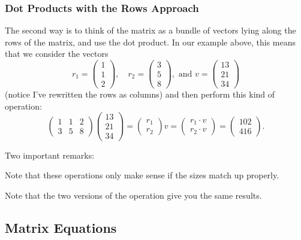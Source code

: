 \documentclass[11pt]{amsart}
\theoremstyle{definition}
\begin{document}
\subsubsection{Dot Products with the Rows Approach} The second way is to think of the matrix as a bundle of vectors lying along the rows of the matrix, and use the dot product. In our example above, this means that we consider the vectors
\[
r_1 = \begin{pmatrix} 1 \\ 1 \\ 2 \end{pmatrix}, \quad
r_2 = \begin{pmatrix} 3 \\ 5 \\ 8 \end{pmatrix}, \text{ and }
v = \begin{pmatrix} 13 \\ 21 \\ 34 \end{pmatrix}
\]
(notice I've rewritten the rows as columns) and then perform this kind of operation:
\[
\begin{pmatrix} 1 & 1 & 2 \\ 3 & 5 & 8 \end{pmatrix} \begin{pmatrix} 13 \\ 21 \\ 34 \end{pmatrix} =
\begin{pmatrix} r_1 \\ r_2 \end{pmatrix} v =
\begin{pmatrix} r_1 \cdot v \\ r_2 \cdot v \end{pmatrix} =
\begin{pmatrix} 102 \\ 416 \end{pmatrix} .
\]


Two important remarks:
\begin{compactitem}
\item Note that these operations only make sense if the sizes match up properly.
\item Note that the two versions of the operation give you the same results.
\end{compactitem}

\subsection{Matrix Equations}
\end{document}
